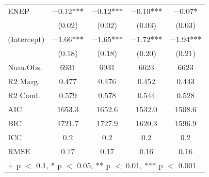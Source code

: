\begin{table}
\begin{tabular}[t]{lcccc}
ENEP & \num{-0.12}*** & \num{-0.12}*** & \num{-0.10}*** & \num{-0.07}*\\
 & (\num{0.02}) & (\num{0.02}) & (\num{0.03}) & (\num{0.03})\\
(Intercept) & \num{-1.66}*** & \num{-1.65}*** & \num{-1.72}*** & \num{-1.94}***\\
 & (\num{0.18}) & (\num{0.18}) & (\num{0.20}) & (\num{0.21})\\
\midrule
Num.Obs. & \num{6931} & \num{6931} & \num{6623} & \num{6623}\\
R2 Marg. & \num{0.477} & \num{0.476} & \num{0.452} & \num{0.443}\\
R2 Cond. & \num{0.579} & \num{0.578} & \num{0.544} & \num{0.528}\\
AIC & \num{1653.3} & \num{1652.6} & \num{1532.0} & \num{1508.6}\\
BIC & \num{1721.7} & \num{1727.9} & \num{1620.3} & \num{1596.9}\\
ICC & \num{0.2} & \num{0.2} & \num{0.2} & \num{0.2}\\
RMSE & \num{0.17} & \num{0.17} & \num{0.16} & \num{0.16}\\
\bottomrule
\multicolumn{5}{l}{\rule{0pt}{1em}+ p $<$ 0.1, * p $<$ 0.05, ** p $<$ 0.01, *** p $<$ 0.001}\\
\end{tabular}
\end{table}
